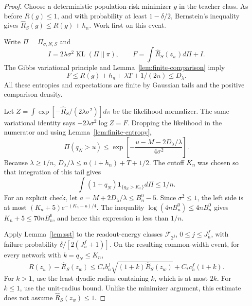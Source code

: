 \begin{proof}
Choose a deterministic population-risk minimizer $g$ in the teacher class. As before $R(g)\leq1$, and with probability at least $1-\delta/2$, Bernstein's inequality gives $\widehat R_S(g)\leq R(g)+h_n$. Work first on this event.

Write $\Pi=\Pi_{\sigma,N,S}$ and
\[
 I=2\lambda\sigma^2\operatorname{KL}(\Pi\|\pi),\qquad
 F=\int\widehat R_S(z_w)d\Pi+I.
\]
The Gibbs variational principle and Lemma~\ref{lem:finite-comparison} imply
\begin{equation}
 F\leq R(g)+h_n+\lambda T+1/(2n)\leq D_\lambda.
 \label{eq:finite-free-energy}
\end{equation}
All these entropies and expectations are finite by Gaussian tails and the positive comparison density.

Let $Z=\int\exp[-\widehat R_S/(2\lambda\sigma^2)]d\pi$ be the likelihood normalizer. The same variational identity says $-2\lambda\sigma^2\log Z=F$. Dropping the likelihood in the numerator and using Lemma~\ref{lem:finite-entropy},
\[
 \Pi(q_N>u)
 \leq\exp\left[-\frac{u-M-2D_\lambda/\lambda}{4\sigma^2}\right].
\]
Because $\lambda\geq1/n$,
$D_\lambda/\lambda\leq n(1+h_n)+T+1/2$. The cutoff $K_n$ was chosen so that integration of this tail gives
\begin{equation}
 \int(1+q_N)\mathbf1_{\{q_N>K_n\}}d\Pi\leq1/n.
 \label{eq:finite-readout-tail}
\end{equation}
For an explicit check, let $a=M+2D_\lambda/\lambda\leq B_n^0-5$. Since $\sigma^2\leq1$, the left side is at most
$(K_n+5)e^{-(K_n-a)/4}$.
The inequality $\log(4nB_n^0)\leq4nB_n^0$ gives
$K_n+5\leq70nB_n^0$, and hence this expression is less than $1/n$.

Apply Lemma~\ref{lem:sst} to the readout-energy classes $\mathcal F_{2^j}$, $0\leq j\leq J_n^f$, with failure probability $\delta/[2(J_n^f+1)]$. On the resulting common-width event, for every network with $k=q_N\leq K_n$,
\begin{equation}
 R(z_w)-\widehat R_S(z_w)
 \leq C_*b_n^f\sqrt{(1+k)\widehat R_S(z_w)}
                       +C_*c_n^f(1+k).
 \label{eq:finite-global-deviation}
\end{equation}
For $k>1$, use the least dyadic radius containing $k$, which is at most $2k$. For $k\leq1$, use the unit-radius bound. Unlike the minimizer argument, this estimate does not assume $\widehat R_S(z_w)\leq1$.


\end{proof}
